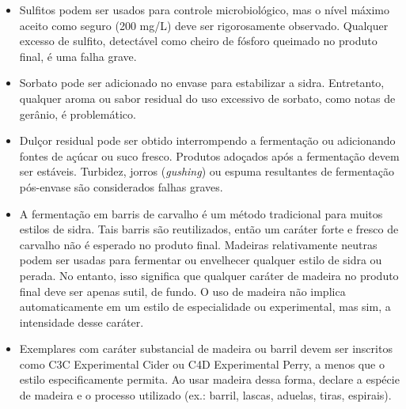 \begin{itemize}
\item Sulfitos podem ser usados para controle microbiológico, mas o nível máximo aceito como seguro (200 mg/L) deve ser rigorosamente observado. Qualquer excesso de sulfito, detectável como cheiro de fósforo queimado no produto final, é uma falha grave.
\item Sorbato pode ser adicionado no envase para estabilizar a sidra. Entretanto, qualquer aroma ou sabor residual do uso excessivo de sorbato, como notas de gerânio, é problemático.
\item Dulçor residual pode ser obtido interrompendo a fermentação ou adicionando fontes de açúcar ou suco fresco. Produtos adoçados após a fermentação devem ser estáveis. Turbidez, jorros (\textit{gushing}) ou espuma resultantes de fermentação pós-envase são considerados falhas graves.
\item A fermentação em barris de carvalho é um método tradicional para muitos estilos de sidra. Tais barris são reutilizados, então um caráter forte e fresco de carvalho não é esperado no produto final. Madeiras relativamente neutras podem ser usadas para fermentar ou envelhecer qualquer estilo de sidra ou perada. No entanto, isso significa que qualquer caráter de madeira no produto final deve ser apenas sutil, de fundo. O uso de madeira não implica automaticamente em um estilo de especialidade ou experimental, mas sim, a intensidade desse caráter.
\item Exemplares com caráter substancial de madeira ou barril devem ser inscritos como C3C Experimental Cider ou C4D Experimental Perry, a menos que o estilo especificamente permita. Ao usar madeira dessa forma, declare a espécie de madeira e o processo utilizado (ex.: barril, lascas, aduelas, tiras, espirais).
\end{itemize}
